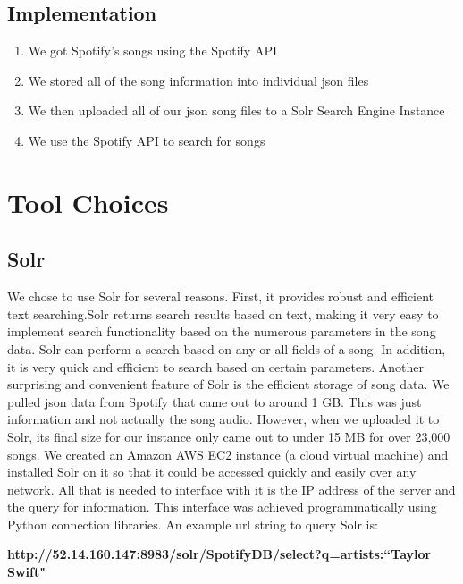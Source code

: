 \documentclass [letter,12pt] {article}
\begin{document}
    \subsection{Implementation}
        \begin{enumerate}
            \item We got Spotify’s songs using the Spotify API
            \item We stored all of the song information into 
                individual json files
            \item We then uploaded all of our json song files to a 
                Solr Search Engine Instance
            \item We use the Spotify API to search for songs 
        \end{enumerate}
        
\section{Tool Choices}
    \subsection{Solr}
        We chose to use Solr for several reasons. First, it provides robust and efficient text searching.Solr returns search results based on text, making it very easy to implement search functionality based on the numerous parameters in the song data. Solr can perform a search based on any or all fields of a song. In addition, it is very quick and efficient to search based on certain parameters. Another surprising and convenient feature of Solr is the efficient storage of song data. We pulled json data from Spotify that came out to around 1 GB. This was just information and not actually the song audio. However, when we uploaded it to Solr, its final size for our instance only came out to under 15 MB for over 23,000 songs. We created an Amazon AWS EC2 instance (a cloud virtual machine) and installed Solr on it so that it could be accessed quickly and easily over any network. All that is needed to interface with it is the IP address of the server and the query for information. This interface was achieved programmatically using Python connection libraries. An example url string to query Solr is:

        \begin{center}
            \textbf{http://52.14.160.147:8983/solr/SpotifyDB/select?q=artists:``Taylor Swift"}
        \end{center}
        
\end{document}
